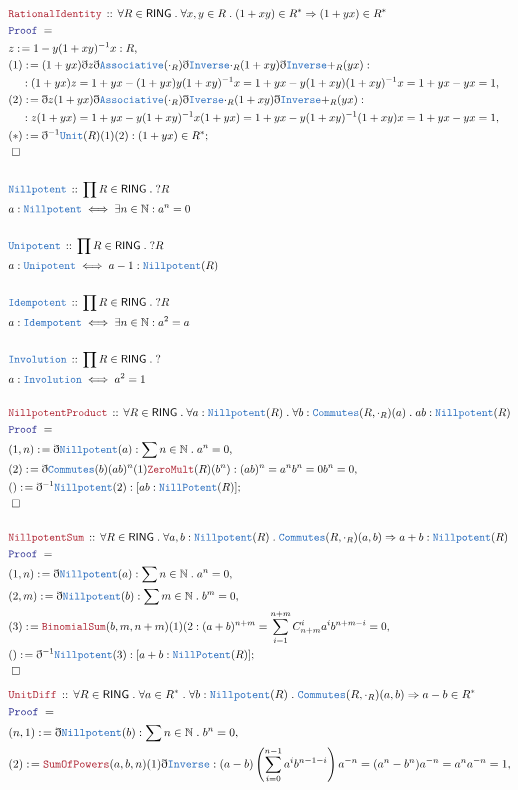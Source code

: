 \documentclass[12pt]{scrartcl}
\newcommand{\TYPE}[1]{\textcolor{NavyBlue}{\mathtt{#1}}}
\newcommand{\LOGIC}[1]{\textcolor{Blue}{\mathtt{#1}}}
\newcommand{\THM}[1]{\textcolor{Maroon}{\mathtt{#1}}}
\renewcommand{\.}{\; . \;}
\newcommand{\de}{: \kern 0.1pc =}
\newcommand{\Theorem}[2]{& \THM{#1} \, :: \, #2 \\ & \Proof = \\ }
\newcommand{\DeclareType}[2]{& \TYPE{#1} \, :: \, #2 \\}
\newcommand{\DefineType}[3]{& #1 : \TYPE{#2} \iff #3 \\}
\newcommand{\NewLine}{\\ & \kern 1pc}
\newcommand{\Page}[1]{ \begin{align*} #1 \end{align*}   }
\newcommand{ \bd }{ \ByDef }
\newcommand{\Nat}{\mathbb{N} }
\newcommand{\Say}[3]{& #1 \de #2 : #3, \\}
\newcommand{\Conclude}[3]{& #1 \de #2 : #3; \\}
\newcommand{\QED}{\; \square}
\newcommand{\EndProof}{& \QED \\}
\newcommand{\ByDef}{\eth}
\newcommand{\Proof}{\LOGIC{Proof} \; }
\newcommand{\RING}{\mathsf{RING}}
\begin{document}
\Page{
	\Theorem{RationalIdentity}{\forall R \in \RING \. \forall x,y \in R \.  (1 + xy) \in R^* \Rightarrow (1 + yx) \in R^*}
	\Say{z}{1 - y(1  + xy)^{-1}x }{R}
	\Say{(1)}{  (1 + yx)\bd z \bd \TYPE{Associative}(\cdot_R) \bd \TYPE{Inverse}{\cdot_R}(1 + xy) \bd \TYPE{Inverse}{+_R}(yx)  }
	{ \NewLine : (1 + yx)z   =  1 + yx - (1 + yx)y(1 + xy)^{-1}x =  1 + yx - y(1 + xy)(1 + xy)^{-1}x = 1 + yx - yx = 1   }
	\Say{(2)}{ \bd z (1 + yx) \bd \TYPE{Associative}(\cdot_R) \bd \TYPE{Iverse}{\cdot_R}(1 + xy) \bd \TYPE{Inverse}{+_R}(yx)    }
	{
		\NewLine : z(1 + yx) =  1 + yx - y(1 + xy)^{-1} x (1 + yx)  = 1 + yx - y(1 + xy)^{-1} (1 + xy)x = 1 + yx - yx = 1
	}
	\Conclude{(*)}{ \bd^{-1} \TYPE{Unit}(R)(1)(2)   }{  (1 + yx) \in R^*     }
	\EndProof
	\\
	\DeclareType{Nillpotent}{ \prod R \in \RING \. ?R   }
	\DefineType{a}{Nillpotent}{ \exists n \in \Nat :  a^n = 0}
	\\
	\DeclareType{Unipotent}{\prod R \in \RING \. ?R}
	\DefineType{a}{Unipotent}{ a - 1 : \TYPE{Nillpotent}(R)  }
	\\
	\DeclareType{Idempotent}{\prod R \in \RING \. ?R}
	\DefineType{a}{Idempotent}{ \exists n \in \Nat : a^2 = a}
	\\
	\DeclareType{Involution}{\prod R \in \RING \. ?}
	\DefineType{a}{Involution}{a^2 = 1}
	\\
	\Theorem{NillpotentProduct}{\forall R \in \RING \.  \forall a : \TYPE{Nillpotent}(R) \. \forall b : \TYPE{Commutes}(R,\cdot_R)(a) \. ab : \TYPE{Nillpotent}(R) }
	\Say{(1,n)}{\bd \TYPE{Nillpotent}(a)}{\sum n \in \Nat \. a^n = 0}
	\Say{(2)}{\bd \TYPE{Commutes}(b)(ab)^n(1)\THM{ZeroMult}(R)(b^n)}{(ab)^n = a^nb^n =0b^n = 0}
	\Conclude{()}{\bd^{-1} \TYPE{Nillpotent}(2)  }{ [ab : \TYPE{NillPotent}(R)]  }
	\EndProof
	\\
	\Theorem{NillpotentSum}{\forall R \in \RING \. \forall a,b : \TYPE{Nillpotent}(R) \. \TYPE{Commutes}(R,\cdot_R)(a,b) \Rightarrow a + b : \TYPE{Nillpotent}(R) }
	\Say{(1,n)}{\bd \TYPE{Nillpotent}(a)}{ \sum n \in \Nat \. a^n = 0}
	\Say{(2,m)}{\bd \TYPE{Nillpotent}(b)}{ \sum m \in \Nat \. b^m = 0}
	\Say{(3)}{\THM{BinomialSum}(b,m,n + m)(1)(2}{ (a + b)^{n + m} = \sum^{n + m}_{i = 1} C^i_{n + m} a^{i}b^{n + m - i} = 0    }
	\Conclude{()}{\bd^{-1} \TYPE{Nillpotent}(3) }{ [a + b : \TYPE{NillPotent}(R)] }
	\EndProof
}\Page{
	\Theorem{UnitDiff}{\forall R \in \RING \.  \forall a \in R^* \. \forall b : \TYPE{Nillpotent}(R) \. \TYPE{Commutes}(R,\cdot_R)(a,b) \Rightarrow a - b \in R^*}
	\Say{(n,1)}{\bd \TYPE{Nillpotent}(b)}{\sum n \in \Nat \. b^n = 0}
	\Say{(2)}{ \THM{SumOfPowers}(a,b,n)(1)\bd \TYPE{Inverse}  }{  (a - b)\left( \sum^{n-1}_{i=0} a^{i}b^{n-1 - i}  \right)a^{-n} = (a^n - b^n)a^{-n} = a^n a^{-n} = 1   }
}
\end{document}
